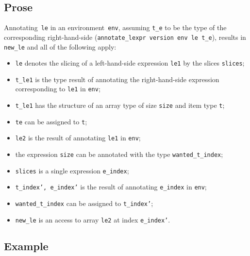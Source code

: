 \documentclass{book}
\begin{document}
  \subsection{Prose}
   Annotating~\texttt{le} in an environment~\texttt{env}, assuming
\texttt{t\_e} to be the type of the corresponding right-hand-side
(\texttt{annotate\_lexpr version env le t\_e}), results in \texttt{new\_le} and
all of the following apply:
   \begin{itemize}
   \item \texttt{le} denotes the slicing of a left-hand-side expression \texttt{le1} by the slices \texttt{slices};
   \item \texttt{t\_le1} is the type result of annotating the right-hand-side expression corresponding to \texttt{le1} in \texttt{env};
   \item \texttt{t\_le1} has the structure of an array type of size \texttt{size} and item type \texttt{t};
   \item \texttt{te} can be assigned to \texttt{t};
   \item \texttt{le2} is the result of annotating \texttt{le1} in \texttt{env};
  \item the expression \texttt{size} can be annotated with the type \texttt{wanted\_t\_index};
  \item \texttt{slices} is a single expression \texttt{e\_index};
   \item \texttt{t\_index', e\_index'} is the result of annotating \texttt{e\_index} in \texttt{env};
   \item \texttt{wanted\_t\_index} can be assigned to \texttt{t\_index'};
   \item \texttt{new\_le} is an access to array \texttt{le2} at index \texttt{e\_index'}.
   \end{itemize}

  \subsection{Example}
\end{document}
